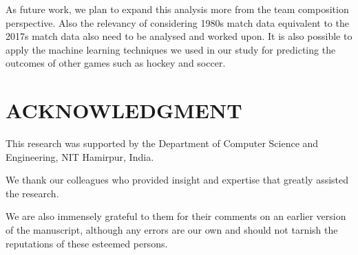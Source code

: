 \documentclass[a4paper, 10pt, conference]{IEEEtran}
\begin{document}
As future work, we plan to expand this analysis more from the team composition perspective. Also the relevancy of considering 1980s match data equivalent to the 2017s match data also need to be analysed and worked upon. It is also possible to apply the machine learning techniques we used in our study for predicting the outcomes of other games such as hockey and soccer.

\section{ACKNOWLEDGMENT}

This research was supported by the Department of Computer Science and Engineering, NIT Hamirpur, India. 

We thank our colleagues who provided insight and expertise that greatly assisted the research. 

We are also immensely grateful to them for their comments on an earlier version of the manuscript, although any errors are our own and should not tarnish the reputations of these esteemed persons.

\end{document}
